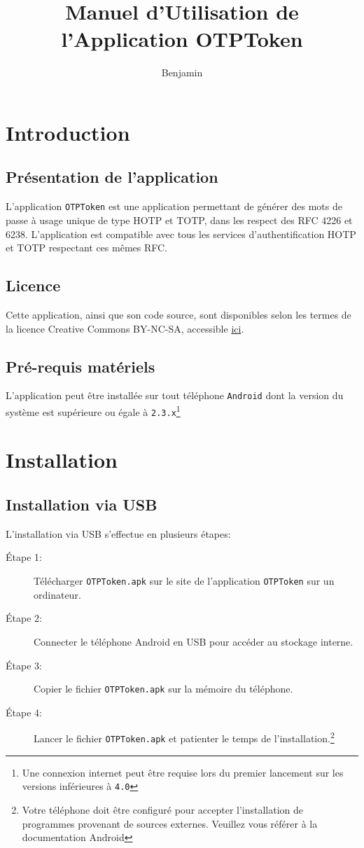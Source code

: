 \documentclass{../../../../res/univ-projet}
\author{Benjamin \bsc{Zigh}}
\title{Manuel d'Utilisation de l'Application OTPToken}
\begin{document}
\maketitle
\newpage
\tableofcontents
\newpage

\section{Introduction}
\subsection{Présentation de l'application}

L'application \verb$OTPToken$ est une application permettant de générer des mots de passe à usage unique de type HOTP et TOTP, dans les respect des RFC 4226 et 6238. L'application est compatible avec tous les services d'authentification HOTP et TOTP respectant ces mêmes RFC.

\subsection{Licence}
Cette application, ainsi que son code source, sont disponibles selon les termes de la licence Creative Commons BY-NC-SA, accessible \href{https://creativecommons.org/licenses/by-nc-sa/4.0/}{ici}.

\subsection{Pré-requis matériels}
L'application peut être installée sur tout téléphone \verb$Android$ dont la version du système est supérieure ou égale à \verb$2.3.x$\footnote{Une connexion internet peut être requise lors du premier lancement sur les versions inférieures à \verb?4.0?}

\section{Installation}
\subsection{Installation via USB}
L'installation via USB s'effectue en plusieurs étapes:
\newline
\begin{description}
\item[Étape 1:] Télécharger \verb$OTPToken.apk$ sur le site de l'application \verb$OTPToken$ sur un ordinateur.
\item[Étape 2:] Connecter le téléphone Android en USB pour accéder au stockage interne.
\item[Étape 3:] Copier le fichier \verb$OTPToken.apk$ sur la mémoire du téléphone.
\item[Étape 4:] Lancer le fichier \verb$OTPToken.apk$ et patienter le temps de l'installation.\footnote{Votre téléphone doit être configuré pour accepter l'installation de programmes provenant de sources externes. Veuillez vous référer à la documentation Android}
\end{description}
\end{document}
